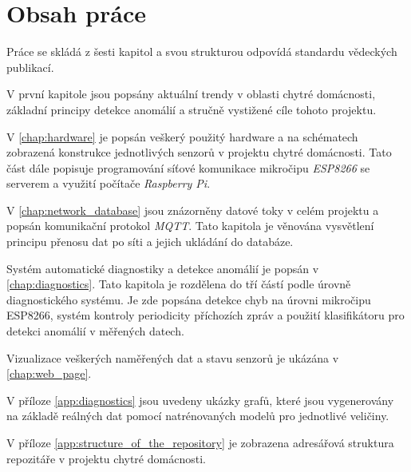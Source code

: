 \section*{Obsah práce} \label{sec:thesis_outline}
Práce se skládá z šesti kapitol a svou strukturou odpovídá standardu vědeckých publikací. \par
V první kapitole jsou popsány aktuální trendy v oblasti chytré domácnosti, základní principy detekce anomálií a stručně vystižené cíle tohoto projektu. \par
V \cref{chap:hardware} je popsán veškerý použitý hardware a na schématech zobrazená konstrukce jednotlivých senzorů v projektu chytré domácnosti. Tato část dále popisuje programování síťové komunikace mikročipu \textit{ESP8266} se serverem a využití počítače \textit{Raspberry Pi}. \par 
V \cref{chap:network_database} jsou znázorněny datové toky v celém projektu a popsán komunikační protokol \textit{MQTT}. Tato kapitola je věnována vysvětlení principu přenosu dat po síti a jejich ukládání do databáze. \par
Systém automatické diagnostiky a detekce anomálií je popsán v \cref{chap:diagnostics}. Tato kapitola je rozdělena do tří částí podle úrovně diagnostického systému. Je zde popsána detekce chyb na úrovni mikročipu ESP8266, systém kontroly periodicity příchozích zpráv a použití klasifikátoru pro detekci anomálií v měřených datech. \par
Vizualizace veškerých naměřených dat a stavu senzorů je ukázána v \cref{chap:web_page}. \par
V příloze \ref{app:diagnostics} jsou uvedeny ukázky grafů, které jsou vygenerovány na základě reálných dat pomocí natrénovaných modelů pro jednotlivé veličiny. \par
V příloze \ref{app:structure_of_the_repository} je zobrazena adresářová struktura repozitáře v projektu chytré domácnosti. 
